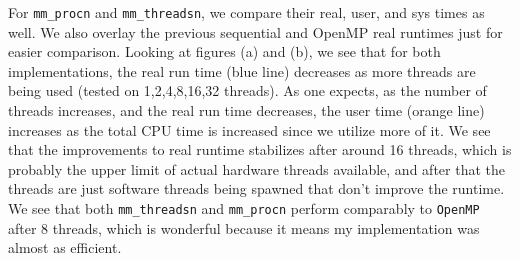 \documentclass{article}
\begin{document}
For \texttt{mm\_procn} and \texttt{mm\_threadsn}, we compare their real, user, and sys times as well. We also overlay the previous sequential and OpenMP real runtimes just for easier comparison. Looking at figures (a) and (b), we see that for both implementations, the real run time (blue line) decreases as more threads are being used (tested on 1,2,4,8,16,32 threads). As one expects, as the number of threads increases, and the real run time decreases, the user time (orange line) increases as the total CPU time is increased since we utilize more of it. We see that the improvements to real runtime stabilizes after around 16 threads, which is probably the upper limit of actual hardware threads available, and after that the threads are just software threads being spawned that don't improve the runtime. We see that both \texttt{mm\_threadsn} and \texttt{mm\_procn} perform comparably to \texttt{OpenMP} after 8 threads, which is wonderful because it means my implementation was almost as efficient.
\end{document}
